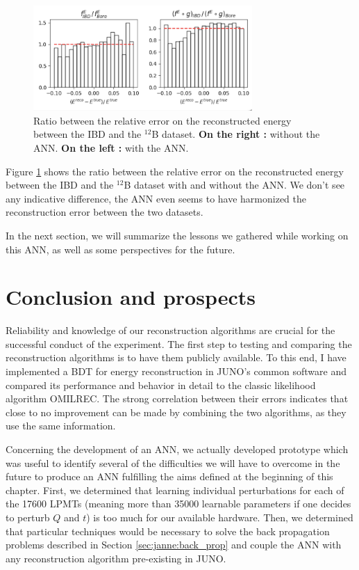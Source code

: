 \documentclass[../main.tex]{subfiles}
\begin{document}
\begin{figure}[!ht]
  \centering
  \includegraphics[height=4cm]{images/janne/ann_effect_400.png}
  \caption{Ratio between the relative error on the reconstructed energy between the IBD and the $^{12}$B dataset. \textbf{On the right :} without the ANN. \textbf{On the left :} with the ANN.}
  \label{fig:janne:ann_effect_400}
\end{figure}

Figure \ref{fig:janne:ann_effect_400} shows the ratio between the relative error on the reconstructed energy between the IBD and the $^{12}$B dataset with and without the ANN. We don't see any indicative difference, the ANN even seems to have harmonized the reconstruction error between the two datasets.

In the next section, we will summarize the lessons we gathered while working on this ANN, as well as some perspectives for the future.

\section{Conclusion and prospects}
\label{sec:janne:conclusion}

Reliability and knowledge of our reconstruction algorithms are crucial for the successful conduct of the experiment. The first step to testing and comparing the reconstruction algorithms is to have them publicly available. To this end, I have implemented a BDT for energy reconstruction in JUNO's common software and compared its performance and behavior in detail to the classic likelihood algorithm OMILREC. The strong correlation between their errors indicates that close to no improvement can be made by combining the two algorithms, as they use the same information.

\hfill

Concerning the development of an ANN, we actually developed prototype which was useful to identify several of the difficulties we will have to overcome in the future to produce an ANN fulfilling the aims defined at the beginning of this chapter. First, we determined that learning individual perturbations for each of the 17600 LPMTs (meaning more than 35000 learnable parameters if one decides to perturb $Q$ and $t$) is too much for our available hardware. Then, we determined that particular techniques would be necessary to solve the back propagation problems
described in Section \ref{sec:janne:back_prop} and couple the ANN with any reconstruction algorithm pre-existing in JUNO.
\end{document}
